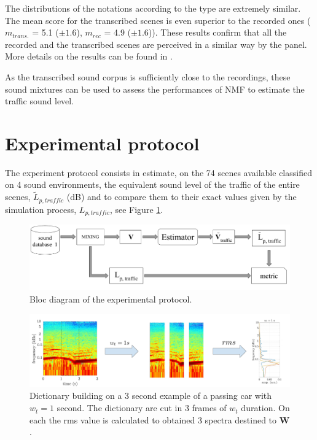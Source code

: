 \documentclass[review,5p,twocolumn,sort&compress,times]{elsarticle}
\begin{document}
The distributions of the notations according to the type are extremely similar. The mean score for the transcribed scenes is even superior to the recorded ones ($m_{trans.}$ = 5.1 ($\pm 1.6$), $m_{rec}$ = 4.9 ($\pm 1.6$)). These results confirm that all the recorded and the transcribed scenes are perceived in a similar way by the panel. More details on the results can be found in  \cite{gloaguen_creation_2017}. 

As the transcribed sound corpus is sufficiently close to the recordings, these sound mixtures can be used to assess the performances of NMF to estimate the traffic sound level.

\section{Experimental protocol}\label{part:expProtocol}

The experiment protocol consists in estimate, on the 74 scenes available classified on 4 sound environments, the equivalent sound level of the traffic of the entire scenes, $\tilde{L}_{p, traffic}$ (dB) and to compare them to their exact values given by the simulation process, $L_{p,traffic}$, see Figure \ref{fig:bloc_diagram_estimator}. 

\begin{figure}[t]
\centering
\includegraphics[width=.9\linewidth]{figures/bloc_diagram_estimator.pdf}
\caption{Bloc diagram of the experimental protocol.}
\label{fig:bloc_diagram_estimator}
\end{figure}

\begin{figure}[t]
\centering
\includegraphics[width=0.8\linewidth]{figures/extractionDictionary2.pdf}
\caption{Dictionary building on a 3 second example of a passing car with $w_t = 1$ second. The dictionary are cut in 3 frames of $w_t$ duration. On each the rms value is calculated to obtained 3 spectra destined to $\mathbf{W}$.}
\label{fig:example_dictionary}
\end{figure}
\end{document}
